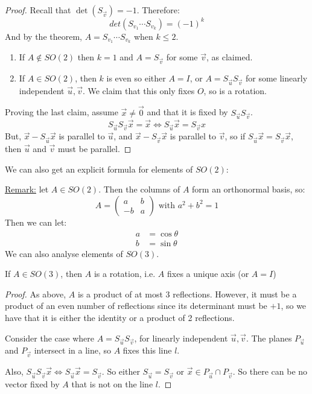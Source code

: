 \documentclass[../Main.tex]{subfiles}
\begin{document}
\begin{proof}
    Recall that $\det{(S_{\vec{v}})} = -1$. Therefore:
    \begin{equation*}
        det{(S_{v_1} \cdots S_{v_k})} = (-1)^k
    \end{equation*}
    And by the theorem, $A = S_{v_1} \cdots S_{v_k}$ when $k \leq 2$.
    \begin{enumerate}
        \item If $A \notin SO(2)$ then $k = 1$ and $A = S_{\vec{v}}$ for some $\vec{v}$, as claimed.
        \item If $A \in SO(2)$, then $k$ is even so either $A = I$, or $A = S_{\vec{u}} S_{\vec{v}}$ for some linearly independent $\vec{u}, \vec{v}$. We claim that this only fixes $O$, so is a rotation.
    \end{enumerate}
    Proving the last claim, assume $\vec{x} \neq \vec{0}$ and that it is fixed by $S_{\vec{u}} S_{\vec{v}}$.
    \begin{equation*}
        S_{\vec{u}} S_{\vec{v}} \vec{x} = \vec{x} \Leftrightarrow S_{\vec{u}} \vec{x} = S_{\vec{v}} x
    \end{equation*}
    But, $\vec{x} - S_{\vec{u}} \vec{x}$ is parallel to $\vec{u}$, and $\vec{x} - S_{\vec{v}} \vec{x}$ is parallel to $\vec{v}$, so if $S_{\vec{u}} \vec{x} = S_{\vec{v}} \vec{x}$, then $\vec{u}$ and $\vec{v}$ must be parallel. \contradiction
\end{proof}
We can also get an explicit formula for elements of $SO(2)$:\par
\underline{Remark:} let $A \in SO(2)$. Then the columns of $A$ form an orthonormal basis, so:
\begin{equation*}
    A =
    \begin{pmatrix}
        a & b \\
        -b & a
    \end{pmatrix}
    \text{ with } a^2 + b^2 = 1
\end{equation*}
Then we can let:
\begin{align*}
    a &= \cos{\theta} \\
    b &= \sin{\theta}
\end{align*}
We can also analyse elements of $SO(3)$.
\begin{lemma}[Elements of $SO(3)$]
    If $A \in SO(3)$, then $A$ is a rotation, i.e. $A$ fixes a unique axis (or $A = I$)
\end{lemma}
\begin{proof}
    As above, $A$ is a product of at most $3$ reflections. However, it must be a product of an even number of reflections since its determinant must be $+1$, so we have that it is either the identity or a product of 2 reflections.\par
    Consider the case where $A = S_{\vec{u}} S_{\vec{v}}$, for linearly independent $\vec{u}, \vec{v}$. The planes $P_{\vec{u}}$ and $P_{\vec{v}}$ intersect in a line, so $A$ fixes this line $l$.\par
    Also, $S_{\vec{u}} S_{\vec{v}} \vec{x} \Leftrightarrow S_{\vec{u}} \vec{x} = S_{\vec{v}}$. So either $S_{\vec{u}} = S_{\vec{v}}$ or $\vec{x} \in P_{\vec{u}} \cap P_{\vec{v}}$. So there can be no vector fixed by $A$ that is not on the line $l$.
\end{proof}
\end{document}
